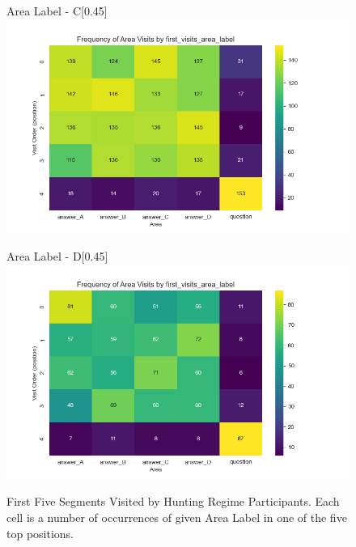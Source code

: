 \documentclass{article}
\begin{document}
\begin{figure}[H]
          \vspace{1em}
        
          \begin{subcaptionbox}{Area Label - C\label{fig:cc}}[0.45\textwidth]
            {\centering\includegraphics[width=\linewidth]{plots/visits/matrix__first_visits_area_label_hunters_C.png}}
          \end{subcaptionbox}
          \hfill
          \begin{subcaptionbox}{Area Label - D\label{fig:dd}}[0.45\textwidth]
            {\centering\includegraphics[width=\linewidth]{plots/visits/matrix__first_visits_area_label_hunters_D.png}}
          \end{subcaptionbox}
          
          \caption{First Five Segments Visited by Hunting Regime Participants. Each cell is a number of occurrences of given Area Label in one of the five top positions.}
          \label{fig:hunt_first_lbl}
        \end{figure}
\end{document}
